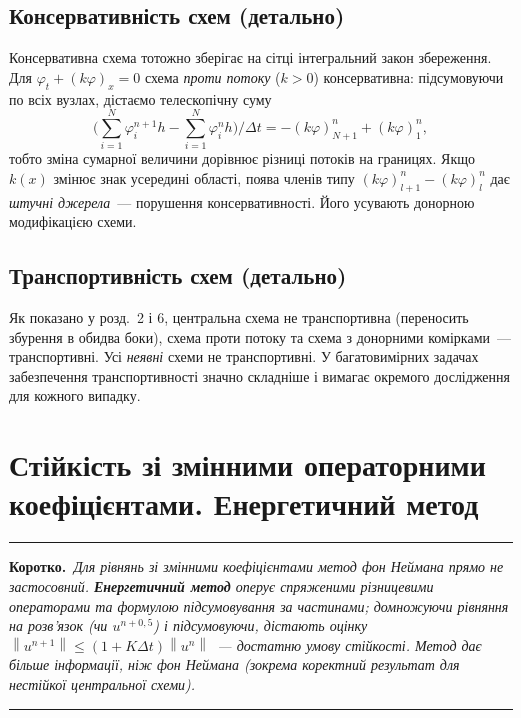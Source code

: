 \documentclass[12pt,a4paper]{article}
\theoremstyle{definition}
\theoremstyle{plain}
\newenvironment{korotko}
  {\par\medskip\noindent\begingroup\color{accent!75!black}\rule{\linewidth}{0.4pt}\par
   \noindent\textbf{Коротко.}\itshape\,}
  {\par\noindent\rule{\linewidth}{0.4pt}\endgroup\medskip}
\newcommand{\norm}[1]{\left\lVert #1 \right\rVert}
\begin{document}
\subsection{Консервативність схем (детально)}
Консервативна схема тотожно зберігає на сітці інтегральний закон
збереження. Для $\varphi_t+(k\varphi)_x=0$ схема \emph{проти потоку}
($k>0$) консервативна: підсумовуючи по всіх вузлах, дістаємо
телескопічну суму
\[
  \Big(\sum_{i=1}^N \varphi_i^{n+1}h-\sum_{i=1}^N \varphi_i^{n}h\Big)\!\Big/\Delta t
  =-(k\varphi)^n_{N+1}+(k\varphi)^n_1,
\]
тобто зміна сумарної величини дорівнює різниці потоків на границях. Якщо
$k(x)$ змінює знак усередині області, поява членів типу
$(k\varphi)^n_{l+1}-(k\varphi)^n_l$ дає \emph{штучні джерела}~---
порушення консервативності. Його усувають донорною модифікацією схеми.

\subsection{Транспортивність схем (детально)}
Як показано у розд.~2 і 6, центральна схема не транспортивна (переносить
збурення в обидва боки), схема проти потоку та схема з донорними
комірками~--- транспортивні. Усі \emph{неявні} схеми не транспортивні. У
багатовимірних задачах забезпечення транспортивності значно складніше і
вимагає окремого дослідження для кожного випадку.

\newpage
\section{Стійкість зі змінними операторними коефіцієнтами. Енергетичний метод}

\begin{korotko}
Для рівнянь зі \emph{змінними коефіцієнтами} метод фон Неймана прямо не
застосовний. \textbf{Енергетичний метод} оперує спряженими різницевими
операторами та формулою підсумовування за частинами; домножуючи рівняння
на розв'язок (чи $u^{n+0,5}$) і підсумовуючи, дістають оцінку
$\norm{u^{n+1}}\le(1+K\Delta t)\norm{u^n}$~--- \emph{достатню} умову
стійкості. Метод дає більше інформації, ніж фон Неймана (зокрема
коректний результат для нестійкої центральної схеми).
\end{korotko}
\end{document}
